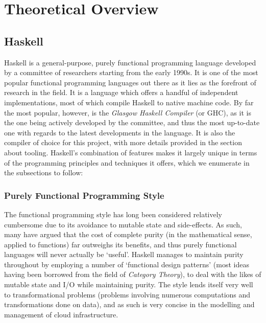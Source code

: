 \documentclass[11pt]{report}
\begin{document}
\newpage

\chapter{Theoretical Overview}

\section{Haskell}

Haskell is a general-purpose, purely functional programming language developed
by a committee of researchers \cite{realworldhaskell} starting from the early
1990s. It is one of the most popular functional programming languages out there
as it lies as the forefront of research in the field. It is a language which
offers a handful of independent implementations, most of which compile Haskell to
native machine code. By far the most popular, however, is the
\textit{Glasgow Haskell Compiler} (or GHC), as it is the one being actively
developed by the committee, and thus the most up-to-date one with regards to the
latest developments in the language. It is also the compiler of choice for this
project, with more details provided in the section about tooling.
Haskell's combination of features makes it largely unique in terms of the
programming principles and techniques it offers, which we enumerate in the
subsections to follow:

\subsection{Purely Functional Programming Style}

The functional programming style has long been considered relatively cumbersome
due to its avoidance to mutable state and side-effects. As such, many have
argued that the cost of complete purity (in the mathematical sense, applied to
functions) far outweighs its benefits, and thus purely functional languages
will never actually be `useful'. Haskell manages to maintain purity throughout
by employing a number of `functional design patterns' (most ideas having been
borrowed from the field of \textit{Category Theory}), to deal with the likes of
mutable state and I/O while maintaining purity.\newline
The style lends itself very well to transformational problems (problems
involving numerous computations and transformations done on data), and as such
is very concise in the  modelling and management of cloud infrastructure.
\end{document}
